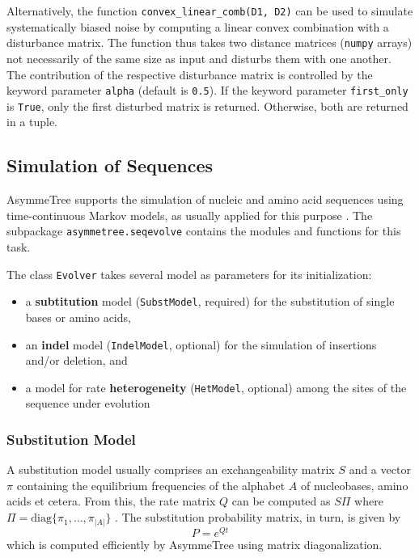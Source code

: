 \documentclass[hidelinks,11pt]{article}
\begin{document}
Alternatively, the function \texttt{convex\_linear\_comb(D1, D2)} can be used to simulate systematically biased noise by computing a linear convex combination with a disturbance matrix.
The function thus takes two distance matrices (\texttt{numpy} arrays) not necessarily of the same size as input and disturbs them with one another.
The contribution of the respective disturbance matrix is controlled by the keyword parameter \texttt{alpha} (default is \texttt{0.5}).
If the keyword parameter \texttt{first\_only} is \texttt{True}, only the first disturbed matrix is returned.
Otherwise, both are returned in a tuple.


\subsection{Simulation of Sequences}

AsymmeTree supports the simulation of nucleic and amino acid sequences using time-continuous Markov models, as usually applied for this purpose \citep[for textbooks, see e.g.][]{felsenstein2004,yang2006,yang2014}.
The subpackage \texttt{asymmetree.seqevolve} contains the modules and functions for this task.

The class \texttt{Evolver} takes several model as parameters for its initialization:
\begin{itemize}
	\item a \textbf{subtitution} model (\texttt{SubstModel}, required) for the substitution of single bases or amino acids,
	\item an \textbf{indel} model (\texttt{IndelModel}, optional) for the simulation of insertions and/or deletion, and
	\item a model for rate \textbf{heterogeneity} (\texttt{HetModel}, optional) among the sites of the sequence under evolution
\end{itemize}

\subsubsection{Substitution Model}

A substitution model usually comprises an exchangeability matrix $S$ and a vector $\pi$ containing the equilibrium frequencies of the alphabet $A$ of nucleobases, amino acids et cetera.
From this, the rate matrix $Q$ can be computed as $S\Pi$ where $\Pi=\textrm{diag}\{\pi_1,\dots,\pi_{|A|}\}$ \citep{yang2006}.
The substitution probability matrix, in turn, is given by \[P=e^{Qt}\] which is computed efficiently by AsymmeTree using matrix diagonalization.
\end{document}
